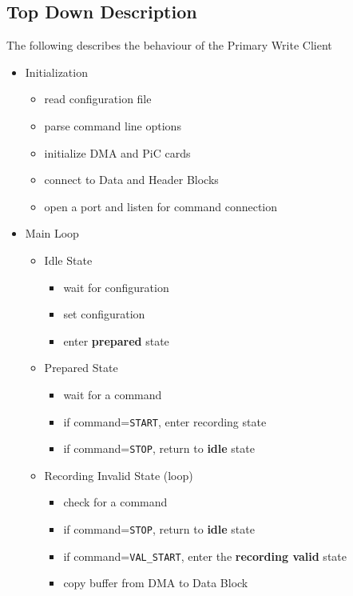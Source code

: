 \subsection{Top Down Description}

The following describes the behaviour of the Primary Write Client

\begin{itemize}
\item Initialization
\vspace{-3mm}
	\begin{itemize}
	\item read configuration file
	\item parse command line options
	\item initialize DMA and PiC cards
	\item connect to Data and Header Blocks
	\item open a port and listen for command connection
	\end{itemize}
\item Main Loop
\vspace{-3mm}
	\begin{itemize}
	\item Idle State
	\vspace{-2mm}
		\begin{itemize}
		\item wait for configuration
		\item set configuration
		\item enter {\bf prepared} state
		\end{itemize}
	\item Prepared State
	\vspace{-2mm}
		\begin{itemize}
		\item wait for a command
		\item if command={\tt *START}, enter recording state
		\item if command={\tt STOP}, return to {\bf idle} state
		\end{itemize}
	\item Recording Invalid State (loop)
	\vspace{-2mm}
		\begin{itemize}
		\item check for a command
		\item if command={\tt STOP}, return to {\bf idle} state
		\item if command={\tt VAL\_START}, enter the {\bf recording valid} state
		\item copy buffer from DMA to Data Block

\end{itemize}
\end{itemize}
\end{itemize}
